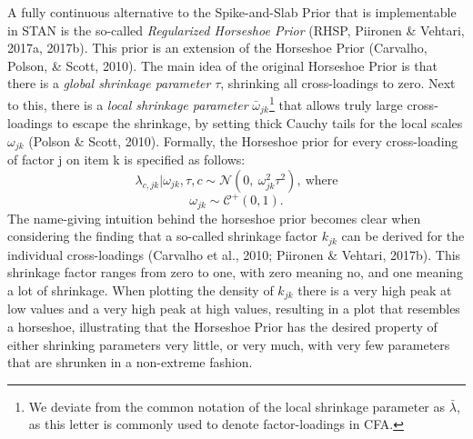 \documentclass[
  man, donotrepeattitle,floatsintext]{apa6}
\begin{document}
A fully continuous alternative to the Spike-and-Slab Prior that is implementable in STAN is the so-called \emph{Regularized Horseshoe Prior} (RHSP, Piironen \& Vehtari, 2017a, 2017b). This prior is an extension of the Horseshoe Prior (Carvalho, Polson, \& Scott, 2010). The main idea of the original Horseshoe Prior is that there is a \emph{global shrinkage parameter} \(\tau\), shrinking all cross-loadings to zero. Next to this, there is a \emph{local shrinkage parameter} \(\bar{\omega}_{jk}\)\footnote{We deviate from the common notation of the local shrinkage parameter as \(\bar{\lambda}\), as this letter is commonly used to denote factor-loadings in CFA.} that allows truly large cross-loadings to escape the shrinkage, by setting thick Cauchy tails for the local scales \(\omega_{jk}\) (Polson \& Scott, 2010). Formally, the Horseshoe prior for every cross-loading of factor j on item k is specified as follows:
\[\lambda_{c,jk} | \omega_{jk}, \tau, c\sim \mathcal{N}(0, \ \omega^2_{jk} \tau^2), \ \text{where}\]
\[\omega_{jk} \sim \mathcal{C^+}(0, 1).\]
The name-giving intuition behind the horseshoe prior becomes clear when considering the finding that a so-called shrinkage factor \(k_{jk}\) can be derived for the individual cross-loadings (Carvalho et al., 2010; Piironen \& Vehtari, 2017b). This shrinkage factor ranges from zero to one, with zero meaning no, and one meaning a lot of shrinkage. When plotting the density of \(k_{jk}\) there is a very high peak at low values and a very high peak at high values, resulting in a plot that resembles a horseshoe, illustrating that the Horseshoe Prior has the desired property of either shrinking parameters very little, or very much, with very few parameters that are shrunken in a non-extreme fashion.
\end{document}
